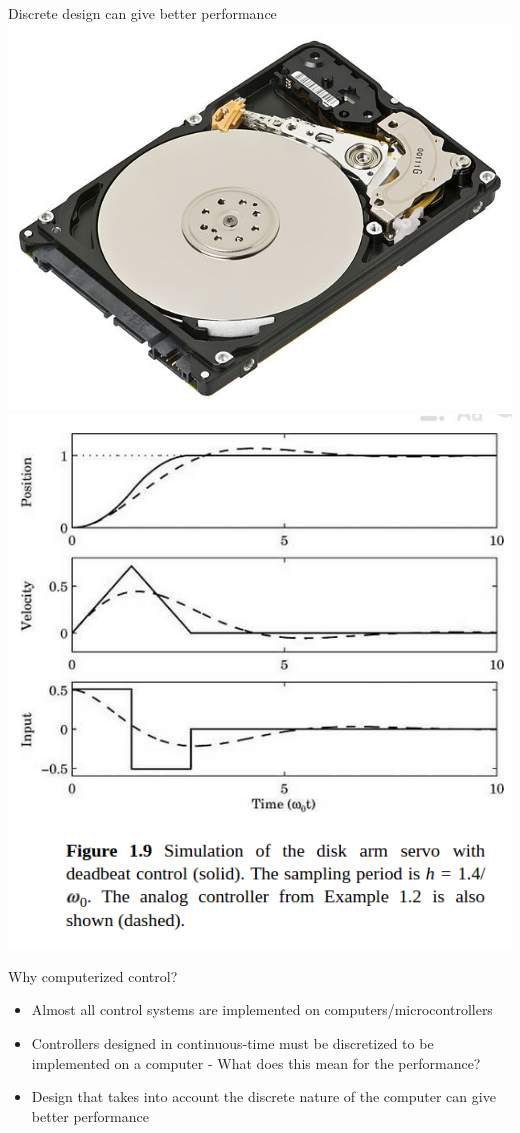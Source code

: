 \documentclass[presentation,aspectratio=169]{beamer}
\begin{document}
\begin{frame}[label=sec-1-6]{Discrete design can give better performance}
\includegraphics[height=0.5\textheight]{../figures/diskdrive.png}
\includegraphics[height=0.8\textheight]{../figures/fig1-9.png}
\end{frame}

\begin{frame}[label=sec-1-7]{Why computerized control?}
\begin{itemize}
\item Almost all control systems are implemented on computers/microcontrollers
\item Controllers designed in continuous-time must be discretized to be implemented on a computer - What does this mean for the performance?
\item Design that takes into account the discrete nature of the computer can give better performance
\end{itemize}
\end{frame}
\end{document}
